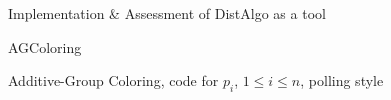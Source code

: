 \documentclass[12pt]{article}  %
\begin{document}
\begin{section}{Implementation \& Assessment of DistAlgo as a tool}
\begin{subsection}{AGColoring}
\begin{algorithm}[H]
\caption{Additive-Group Coloring, code for $p_i$, $1 \leq i \leq n$, polling style}
\end{algorithm}
\end{subsection}

\end{section}
\end{document}
